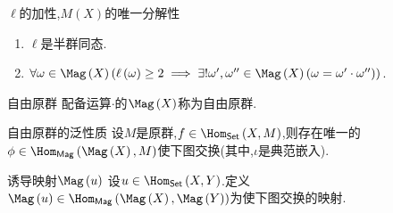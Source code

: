 \begin{proposition}{$\ell$的加性,$M\left(X\right)$的唯一分解性}{}
	\begin{enumerate}
		\item $\ell$是半群同态.
		\item $\forall \omega\in\Mag\left(X\right)\left(\ell\left(\omega\right)\geq 2\implies\exists!\omega^{\prime},\omega^{\prime\prime}\in \Mag\left(X\right)\left(\omega=\omega^{\prime}\cdot\omega^{\prime\prime}\right)\right)$.
	\end{enumerate}
\end{proposition}

\begin{definition}{自由原群}{}
	配备运算$\cdot$的$\Mag\left(X\right)$称为自由原群.
\end{definition}

\begin{proposition}{自由原群的泛性质}{}
	设$M$是原群,$f\in\Hom_{\mathsf{Set}}\left(X,M\right)$,则存在唯一的$\phi\in\Hom_{\mathsf{Mag}}\left(\Mag\left(X\right),M\right)$使下图交换(其中,$\iota$是典范嵌入).
	\begin{center}
	\end{center}
\end{proposition}

\begin{definition}{诱导映射$\Mag\left(u\right)$}{}
	设$u\in\Hom_{\mathsf{Set}}\left(X,Y\right)$.定义$\Mag\left(u\right)\in\Hom_{\mathsf{Mag}}\left(\Mag\left(X\right),\Mag\left(Y\right)\right)$为使下图交换的映射.
	\begin{center}
	\end{center}
\end{definition}

